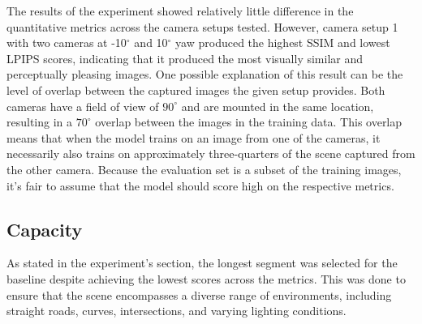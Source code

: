 The results of the experiment showed relatively little difference in the quantitative metrics across the camera setups tested. However, camera setup 1 with two cameras at -10$^{\circ}$ and 10$^{\circ}$ yaw produced the highest SSIM and lowest LPIPS scores, indicating that it produced the most visually similar and perceptually pleasing images. One possible explanation of this result can be the level of overlap between the captured images the given setup provides. Both cameras have a field of view of $90^\circ$ and are mounted in the same location, resulting in a $70^\circ$ overlap between the images in the training data. This overlap means that when the model trains on an image from one of the cameras, it necessarily also trains on approximately three-quarters of the scene captured from the other camera. Because the evaluation set is a subset of the training images, it's fair to assume that the model should score high on the respective metrics.


\begin{comment}
- The position of the camera was arbitrary. Could've done more research into how cameras on cars usually are rigged.
- The camera setups are very sparse, a lot of different possibilities.

Results:
- Relatively little difference in the quantitative results.
- Why did the -10 and 10 yaw yield the best SSIM and LPIPS?
- The evaluation images are a subset of the training images. Because the -10 and 10 have a lot of overlap, they have a lot of common training data which will allow the model to learn the scene which it is evaluated on, in turn yielding high scores on the chosen metrics.


This overlap allows the model to train and learn the scene which it is evaluated on, because the evaluation set is a subset of the training images, more than the other setups, and it'll naturally score high on the respective images.

the model to train on the partial scene with two times the amount of data, and since the evaluation set is a subset of the training images, it'll naturally score high on the respective images.

\end{comment}










\subsection{Capacity}
As stated in the experiment's section, the longest segment was selected for the baseline despite achieving the lowest scores across the metrics. This was done to ensure that the scene encompasses a diverse range of environments, including straight roads, curves, intersections, and varying lighting conditions.


